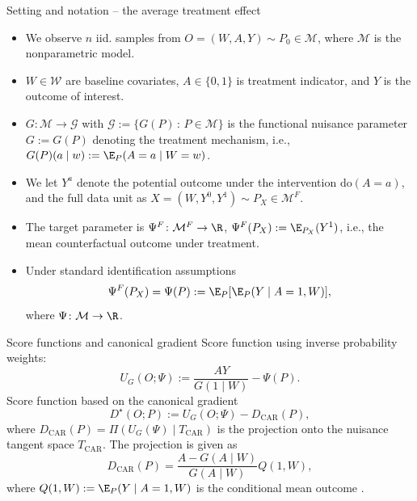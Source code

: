 \documentclass[smaller]{beamer}\usepackage{listings}
\begin{document}
\begin{frame}[label={sec:org67d37da}]{Setting and notation -- the average treatment effect}
\begin{itemize}[<+->]
\item We observe \(n\) iid. samples from \(O = (W, A, Y) \sim P_0 \in \mathcal M\), where \(\mathcal M\)
is the nonparametric model.
\item \(W \in \mathcal W\) are baseline covariates, \(A \in \{0,1\}\) is treatment indicator, and \(Y\)
is the outcome of interest.
\item \(G \colon \mathcal M \rightarrow \mathcal G\) with \(\mathcal G := \{G(P) \, : \, P \in \mathcal
  M\}\) is the functional nuisance parameter \(G := G(P)\) denoting the treatment mechanism, i.e.,
\(G(P)(a \mid w) := \E_{P}(A=a \mid W=w)\).
\item We let \(Y^a\) denote the potential outcome under the intervention \(\mathrm{do}(A = a)\), and the
full data unit as \(X = (W, Y^0, Y^1) \sim P_X \in \mathcal M^F\).
\item The target parameter is \(\Psi^F \colon \mathcal M^F \rightarrow \R\), \(\Psi^F(P_X) :=
  \E_{P_X}(Y^1)\), i.e., the mean counterfactual outcome under treatment.
\item Under standard identification assumptions
\begin{equation*}
  \Psi^F(P_X) = \Psi(P) := \E_{P}[\E_{P}(Y \mid A=1, W)],
\end{equation*}
where \(\Psi\colon \mathcal M \rightarrow \R\).
\end{itemize}
\end{frame}

\begin{frame}[label={sec:org24311a0}]{Score functions and canonical gradient}
Score function using inverse probability weights:
\begin{equation*}
  U_G(O; \Psi) := \frac{AY}{G(1 \mid W)} - \Psi(P).
\end{equation*}
\pause Score function based on the canonical gradient
\begin{equation*}
  D^{\star}(O; P) := U_G(O; \Psi) - D_{\text{CAR}}(P),
\end{equation*}
where \(D_{\text{CAR}}(P) = \Pi(U_G(\Psi) \mid T_{\text{CAR}})\) is the projection onto the nuisance
tangent space \(T_{\text{CAR}}\). \pause The projection is given as
\begin{equation*}
  D_{\text{CAR}}(P) = \frac{A - G(A \mid W)}{G(A \mid W)}Q(1, W),
\end{equation*}
where \(Q(1, W) := \E_{P}(Y \mid A=1, W)\) is the conditional mean outcome \citep{robins1994estimation,van2003unified}.
\end{frame}
\end{document}
